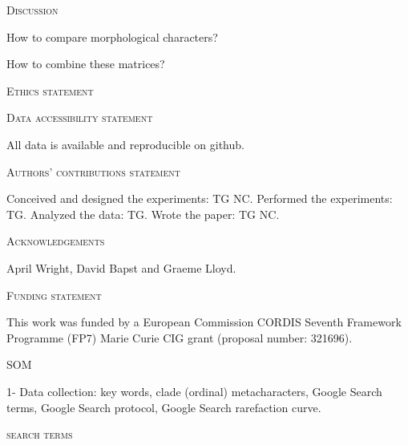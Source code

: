 \documentclass[12pt,letterpaper]{article}
\renewcommand{\section}[1]{%
\bigskip
\begin{center}
\begin{Large}
\normalfont\scshape #1
\medskip
\end{Large}
\end{center}}
\begin{document}
%
%

\section{Discussion}

How to compare morphological characters?

How to combine these matrices?

\section{Ethics statement}
\section{Data accessibility statement}
All data is available and reproducible on github.
\section{Authors’ contributions statement}
Conceived and designed the experiments: TG NC. Performed the experiments: TG. Analyzed the data: TG. Wrote the paper: TG NC.
\section{Acknowledgements}
April Wright, David Bapst and Graeme Lloyd.
\section{Funding statement}
This work was funded by a European Commission CORDIS Seventh Framework Programme (FP7) Marie Curie CIG grant (proposal number: 321696).



%
%




\section{SOM}
1- Data collection: key words, clade (ordinal) metacharacters, Google Search terms, Google Search protocol, Google Search rarefaction curve.

\section{search terms}
\end{document}

